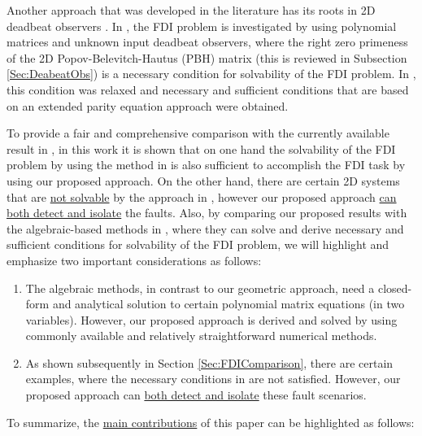 \documentclass[journal,12pt,draftcls,onecolumn]{IEEEtran}
\begin{document}
Another approach that was developed in the literature \cite{BisiaccoMultiDim,BisiaccoLetter} has its roots in 2D deadbeat observers \cite{Bisiacco_Obs}. In \cite{BisiaccoMultiDim}, the FDI  problem is investigated by using polynomial matrices and unknown input deadbeat observers, where the right zero primeness of the 2D Popov-Belevitch-Hautus (PBH) matrix (this is reviewed in Subsection \ref{Sec:DeabeatObs})  is a necessary condition for solvability of the FDI problem. In \cite{BisiaccoLetter}, this condition was relaxed and  necessary and sufficient conditions that are based on an extended parity equation approach were obtained.

To provide a fair and comprehensive comparison with the currently available result in \cite{Malek_3DFDI}, in this work it is shown that on one hand the solvability of the FDI problem by using the method in \cite{Malek_3DFDI} is also sufficient to accomplish the FDI task by using our proposed approach. On the other hand, there are certain 2D systems that are \underline{not solvable} by the approach in \cite{Malek_3DFDI}, however our proposed approach \underline{can both detect and isolate} the faults. Also, by comparing our proposed results with the algebraic-based methods in \cite{BisiaccoMultiDim,BisiaccoLetter}, where they can solve and derive necessary and sufficient conditions for solvability of the FDI problem, we will highlight and emphasize  two important considerations as follows:
\begin{enumerate}
	\item The algebraic methods, in contrast to our geometric approach,  need a closed-form and analytical solution to certain polynomial matrix equations (in two variables). However, our proposed approach is derived and solved by using commonly available and relatively straightforward numerical methods.
	\item As shown subsequently in Section \ref{Sec:FDIComparison}, there are certain examples, where the necessary conditions in \cite{BisiaccoMultiDim,BisiaccoLetter} are not satisfied. However, our proposed approach can \underline{both detect and isolate} these fault scenarios.
\end{enumerate}
To summarize, the \underline{main contributions} of this paper can be highlighted as follows:
\end{document}
